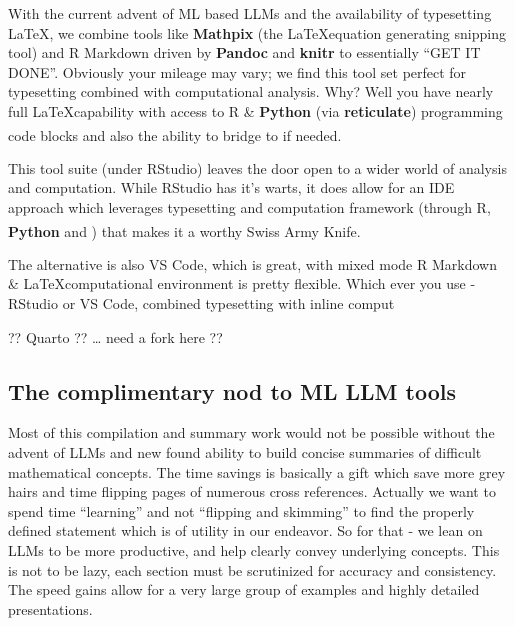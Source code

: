 \documentclass[
  12 pt,
  a4paper,
]{book}
\newcommand{\textpoppins}[1]{{\poppins #1}}
\newcommand{\textfluxreg}[1]{{\fluxreg #1}}
\newcommand{\textlato}[1]{{\lato #1}}
\newcommand{\textssp}[1]{{\ssp #1}}
\newcommand{\textcouriernew}[1]{{\couriernew #1}}
\newcommand{\textarial}[1]{{\arial #1}}
\newcommand{\textpalatino}[1]{{\palatino #1}}
\numberwithin{equation}{section}
\theoremstyle{plain}      %
\theoremstyle{definition} %
\theoremstyle{remark}     %
\theoremstyle{note}         %
\begin{document}
With the current advent of ML based LLMs and the availability of
typesetting \LaTeX , we combine tools like
\textbf{\large{\textpoppins{Mathpix}}} (the \LaTeX   equation generating
snipping tool) and \textcouriernew{R Markdown} driven by
\textbf{\large{\textarial{Pandoc}}} and
\textbf{\large{\textpalatino{knitr}}} to essentially ``GET IT DONE''.
Obviously your mileage may vary; we find this tool set perfect for
typesetting combined with computational analysis. Why? Well you have
nearly full \LaTeX  capability with access to R \&
\textbf{\large{\textfluxreg{Python}}} (via
\textbf{\large{\textlato{reticulate}}}) programming code blocks and also
the ability to bridge to
\text{\large{\textssp{MATHEMATICA}}}\textsuperscript{\textregistered} if
needed.

This tool suite (under RStudio) leaves the door open to a wider world of
analysis and computation. While RStudio has it's warts, it does allow
for an IDE approach which leverages typesetting and computation
framework (through R, \textbf{\large{\textfluxreg{Python}}} and
\text{\large{\textssp{MATHEMATICA}}}\textsuperscript{\textregistered})
that makes it a worthy Swiss Army Knife.

The alternative is also VS Code, which is great, with mixed mode
\textcouriernew{R Markdown} \& \LaTeX  computational environment is
pretty flexible. Which ever you use - RStudio or VS Code, combined
typesetting with inline comput

?? Quarto ?? \ldots{} need a fork here ??

\hypertarget{the-complimentary-nod-to-ml-llm-tools}{%
\subsection*{The complimentary nod to ML LLM
tools}\label{the-complimentary-nod-to-ml-llm-tools}}

Most of this compilation and summary work would not be possible without
the advent of LLMs and new found ability to build concise summaries of
difficult mathematical concepts. The time savings is basically a gift
which save more grey hairs and time flipping pages of numerous cross
references. Actually we want to spend time ``learning'' and not
``flipping and skimming'' to find the properly defined statement which
is of utility in our endeavor. So for that - we lean on LLMs to be more
productive, and help clearly convey underlying concepts. This is not to
be lazy, each section must be scrutinized for accuracy and consistency.
The speed gains allow for a very large group of examples and highly
detailed presentations.
\end{document}
